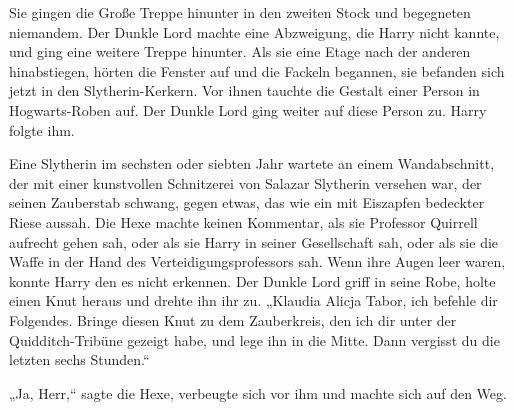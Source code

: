 Sie gingen die Große Treppe hinunter in den zweiten Stock und begegneten niemandem.
Der Dunkle Lord machte eine Abzweigung, die Harry nicht kannte, und ging eine weitere Treppe hinunter. Als sie eine Etage nach der anderen hinabstiegen, hörten die Fenster auf und die Fackeln begannen, sie befanden sich jetzt in den Slytherin-Kerkern.
Vor ihnen tauchte die Gestalt einer Person in Hogwarts-Roben auf.
Der Dunkle Lord ging weiter auf diese Person zu.
Harry folgte ihm.

Eine Slytherin im sechsten oder siebten Jahr wartete an einem Wandabschnitt, der mit einer kunstvollen Schnitzerei von Salazar Slytherin versehen war, der seinen Zauberstab schwang, gegen etwas, das wie ein mit Eiszapfen bedeckter Riese aussah. Die Hexe machte keinen Kommentar, als sie Professor Quirrell aufrecht gehen sah, oder als sie Harry in seiner Gesellschaft sah, oder als sie die Waffe in der Hand des Verteidigungsprofessors sah. Wenn ihre Augen leer waren, konnte Harry den es nicht erkennen.
Der Dunkle Lord griff in seine Robe, holte einen Knut heraus und drehte ihn ihr zu.
„Klaudia Alicja Tabor, ich befehle dir Folgendes. Bringe diesen Knut zu dem Zauberkreis, den ich dir unter der Quidditch-Tribüne gezeigt habe, und lege ihn in die Mitte. Dann vergisst du die letzten sechs Stunden.“

„Ja, Herr,“ sagte die Hexe, verbeugte sich vor ihm und machte sich auf den Weg.

